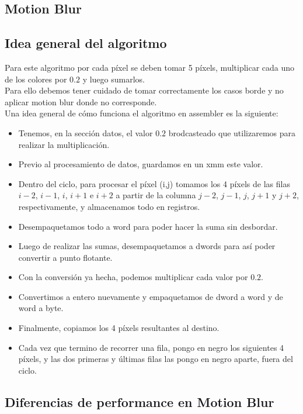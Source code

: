 \documentclass[a4paper]{article}
\begin{document}
\newpage
\subsection{Motion Blur}
\subsection{Idea general del algoritmo}
Para este algoritmo por cada píxel se deben tomar 5 píxels, multiplicar cada uno de los colores por $0.2$ y luego sumarlos.
\\
Para ello debemos tener cuidado de tomar correctamente los casos borde y no aplicar motion blur donde no corresponde.
\\
Una idea general de cómo funciona el algoritmo en assembler es la siguiente:

\begin{itemize}
\item  Tenemos, en la sección datos, el valor $0.2$ brodcasteado que utilizaremos para realizar la multiplicación.
\item  Previo al procesamiento de datos, guardamos en un xmm este valor.
\item  Dentro del ciclo, para procesar el píxel (i,j) tomamos los 4 píxels de las filas $i-2$, $i-1$, $i$, $i+1$ e $i+2$ a partir de la columna $j-2$, $j-1$, $j$, $j+1$ y $j+2$, respectivamente, y almacenamos todo en registros.
\item  Desempaquetamos todo a word para poder hacer la suma sin desbordar.
\item  Luego de realizar las sumas, desempaquetamos a dwords para así poder convertir a punto flotante.
\item  Con la conversión ya hecha, podemos multiplicar cada valor por $0.2$.
\item  Convertimos a entero nuevamente y empaquetamos de dword a word y de word a byte.
\item  Finalmente, copiamos los 4 píxels resultantes al destino. 
\item  Cada vez que termino de recorrer una fila, pongo en negro los siguientes 4 píxels, y las dos primeras y últimas filas las pongo en negro aparte, fuera del ciclo.
\end{itemize}

\subsection{Diferencias de performance en Motion Blur}
\end{document}

